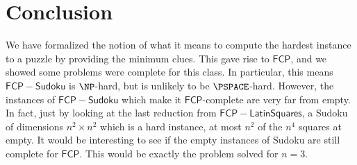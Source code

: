 \documentclass[runningheads,a4paper]{llncs}
\begin{document}
\section{Conclusion}
\label{sec:conclusion}

We have formalized the notion of what it means to compute the hardest instance to a puzzle by providing the minimum clues. This gave rise to $\mathsf{FCP}$, and we showed some problems were complete for this class. In particular, this means $\mathsf{FCP-Sudoku}$ is $\NP$-hard, but is unlikely to be $\PSPACE$-hard. However, the instances of $\mathsf{FCP-Sudoku}$ which make it $\mathsf{FCP}$-complete are very far from empty. In fact, just by looking at the last reduction from $\mathsf{FCP-Latin Squares}$, a Sudoku of dimensions $n^2 \times n^2$ which is a hard instance, at most $n^2$ of the $n^4$ squares at empty. It would be interesting to see if the empty instances of Sudoku are still complete for $\mathsf{FCP}$. This would be exactly the problem \cite{mcguire2012there} solved for $n = 3$. 



\end{document}
